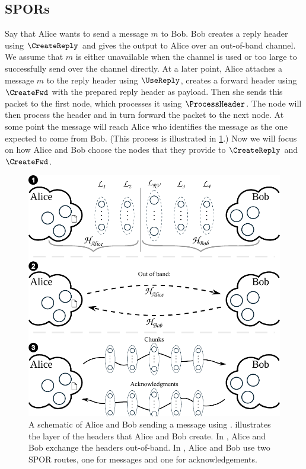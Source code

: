 
\subsection{\Acfp*{SPOR}}%
\label{sec:message_passing}

Say that Alice wants to send a message \(m\) to Bob.
Bob creates a reply header using \(\CreateReply\) and gives the output to Alice 
over an out-of-band channel.
We assume that \(m\) is either unavailable when the channel is used or too 
large to successfully send over the channel directly.
At a later point, Alice attaches a message \(m\) to the reply header using 
\(\UseReply\), creates a forward header using \(\CreateFwd\) with the prepared 
reply header as payload.
Then she sends this packet to the first node, which processes it using 
\(\ProcessHeader\).
The node will then process the header and in turn forward the packet to the 
next node.
At some point the message will reach Alice who identifies the message as the 
one expected to come from Bob.
(This process is illustrated in \cref{fig:file-exchange}.)
Now we will focus on how Alice and Bob choose the nodes that they provide to 
\(\CreateReply\) and \(\CreateFwd\).

\begin{figure}
  \includegraphics[width=\linewidth]{figures/file_exchange_v2.pdf}
  \caption{\label{fig:file-exchange}%
    A schematic of Alice and Bob sending a message using \name.
     illustrates the layer of the headers that Alice and Bob create.
    In , Alice and Bob exchange the headers out-of-band.
    In , Alice and Bob use two \ac{SPOR} routes, one for messages and 
    one for acknowledgements.
  }
\end{figure}

